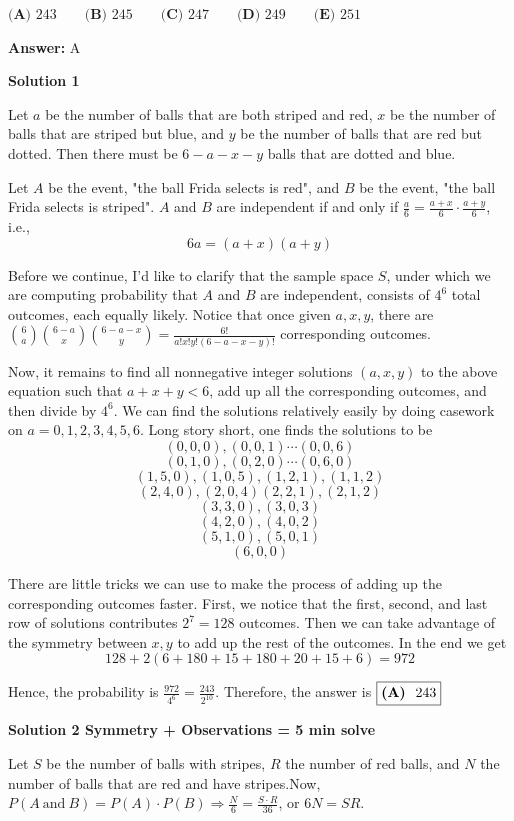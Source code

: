 \begin{enumerate}
 $\textbf{(A) } 243 \qquad \textbf{(B) } 245 \qquad \textbf{(C) } 247 \qquad \textbf{(D) } 249\qquad \textbf{(E) } 251$

 \textbf{Answer: }A



\textbf{Solution 1}

Let $a$ be the number of balls that are both striped and red, $x$ be the number of balls that are striped but blue, and $y$ be the number of balls that are red but dotted. Then there must be $6-a-x-y$ balls that are dotted and blue.

 Let $A$ be the event, "the ball Frida selects is red", and $B$ be the event, "the ball Frida selects is striped". $A$ and $B$ are independent if and only if $\frac{a}{6}=\frac{a+x}{6}\cdot\frac{a+y}{6}$, i.e.,
 \[6a=(a+x)(a+y)\]

 Before we continue, I'd like to clarify that the sample space $S$, under which we are computing probability that $A$ and $B$ are independent, consists of $4^6$ total outcomes, each equally likely. Notice that once given $a, x, y$, there are ${6\choose a}{6-a \choose x}{6-a-x \choose y}=\frac{6!}{a!x!y!(6-a-x-y)!}$ corresponding outcomes.

 Now, it remains to find all nonnegative integer solutions $(a, x, y)$ to the above equation such that $a+x+y<6$, add up all the corresponding outcomes, and then divide by $4^6$. We can find the solutions relatively easily by doing casework on $a=0, 1, 2, 3, 4, 5, 6$. Long story short, one finds the solutions to be
 \[(0, 0, 0), (0, 0, 1)\cdots (0, 0, 6)\]
 \[(0, 1, 0), (0, 2, 0)\cdots (0, 6, 0)\]
 \[(1, 5, 0), (1, 0, 5), (1, 2, 1), (1, 1, 2)\]
 \[(2, 4, 0), (2, 0, 4) (2, 2, 1), (2, 1, 2)\]
 \[(3, 3, 0), (3, 0, 3)\]
 \[(4, 2, 0), (4, 0, 2)\]
 \[(5, 1, 0), (5, 0, 1)\]
 \[(6, 0, 0)\]

 There are little tricks we can use to make the process of adding up the corresponding outcomes faster. First, we notice that the first, second, and last row of solutions contributes $2^7=128$ outcomes. Then we can take advantage of the symmetry between $x, y$ to add up the rest of the outcomes. In the end we get
 \[128+2(6+180+15+180+20+15+6)=972\]

 Hence, the probability is $\frac{972}{4^6}=\frac{243}{2^{10}}$. Therefore, the answer is $\fbox{\textbf{(A) } 243}$




\textbf{Solution 2 Symmetry + Observations = 5 min solve}

Let $S$ be the number of balls with stripes, $R$ the number of red balls, and $N$ the number of balls that are red and have stripes.Now, $P(A\ \text{and}\ B) = P(A) \cdot P(B) \Rightarrow \frac{N}{6}=\frac{S \cdot R}{36}$, or $6N = SR$.


\end{enumerate}
